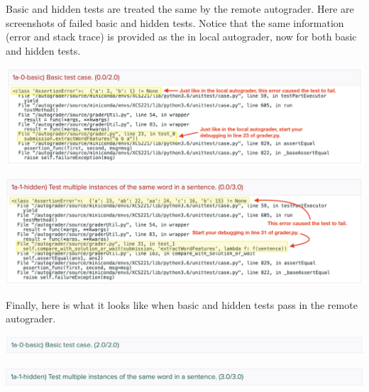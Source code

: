 Basic and hidden tests are treated the same by the remote autograder.  Here are
screenshots of failed basic and hidden tests.  Notice that the same information
(error and stack trace) is provided as the in local autograder, now for both
basic and hidden tests.

\begin{center}
\includegraphics[width=1\textwidth]{00-instructions/remote-basic-failed.png}
\end{center}

\begin{center}
\includegraphics[width=1\textwidth]{00-instructions/remote-hidden-failed.png}
\end{center}

Finally, here is what it looks like when basic and hidden tests pass in the
remote autograder.

\begin{center}
\includegraphics[width=1\textwidth]{00-instructions/remote-basic-passed.png}
\end{center}

\begin{center}
\includegraphics[width=1\textwidth]{00-instructions/remote-hidden-passed.png}
\end{center}
